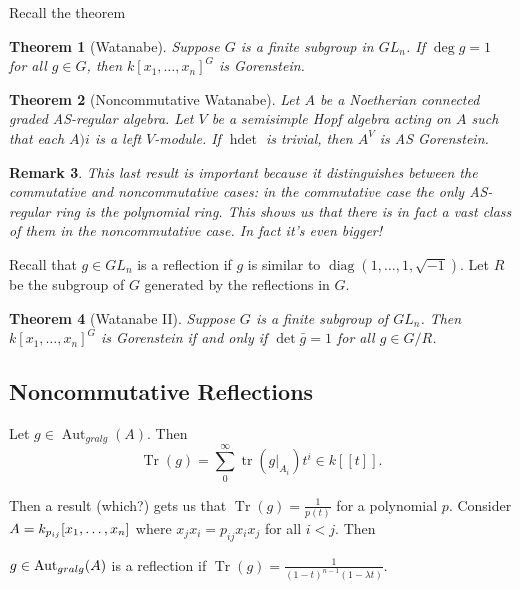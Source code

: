 \documentclass[12pt]{article}
\theoremstyle{break}
\theoremstyle{nonumberbreak}
\theoremstyle{changebreak}
\newtheorem{thm}{Theorem}[subsection]
\theoremstyle{break}
\theoremstyle{nonumberbreak}
\theoremstyle{nonumberplain}
\theoremstyle{change}
\newtheorem{rmk}[thm]{Remark}
\DeclareMathOperator{\Aut}{Aut}
\let\tilde\relax
\newcommand*{\tilde}[1]{\widetilde{#1}}
\begin{document}
Recall the theorem
\begin{thm}[Watanabe]
	Suppose $G$ is a finite subgroup in $GL_n$. If $\deg g=1$ for all $g\in G$, then $k[x_1,\dots,x_n]^G$ is Gorenstein.
\end{thm}
\begin{thm}[Noncommutative Watanabe]
	Let $A$ be a Noetherian connected graded AS-regular algebra. Let $V$ be a semisimple Hopf algebra acting on 
	$A$ such that each $A)i$ is a left $V$-module. If $\operatorname{hdet}$ is trivial, then $A^V$ is AS Gorenstein.
\end{thm}
\begin{rmk}
	This last result is important because it distinguishes between the commutative and noncommutative cases: in the commutative
	case the only AS-regular ring is the polynomial ring. This shows us that there is in fact a vast class of them 
	in the noncommutative case. In fact it's even bigger!
\end{rmk}
Recall that $g\in GL_n$ is a reflection if $g$ is similar to $\operatorname{diag}(1,\dots,1,\sqrt{-1})$. Let $R$ be the subgroup of $G$ generated
by the reflections in $G$. 
\begin{thm}[Watanabe II]
	Suppose $G$ is a finite subgroup of $GL_n$. Then $k[x_1,\dots,x_n]^G$ is Gorenstein if and only if
	$\det \bar g=1$ for all $g\in G/R$.
\end{thm}

\subsection{Noncommutative Reflections}
\begin{defn}
	Let $g\in\Aut_{gralg}(A)$. Then
	\[\operatorname{Tr}(g)=\sum_0^\infty \operatorname{tr}(g|_{A_i})t^i\in k[[t]].\]
\end{defn}
Then a result (which?) gets us that $\operatorname{Tr}(g)=\frac{1}{p(t)}$ for a polynomial $p$.
Consider $\tilde A=k_{p_{ij}}[x_1,\dots,x_n]$ where $x_jx_i=p_{ij}x_ix_j$ for all $i<j$. Then 
\begin{defn}
	$g\in\Aut_{gralg}(\tilde A)$ is a reflection if $\operatorname{Tr}(g)=\frac{1}{(1-t)^{n-1}(1-\lambda t)}$.
\end{defn}
\end{document}
